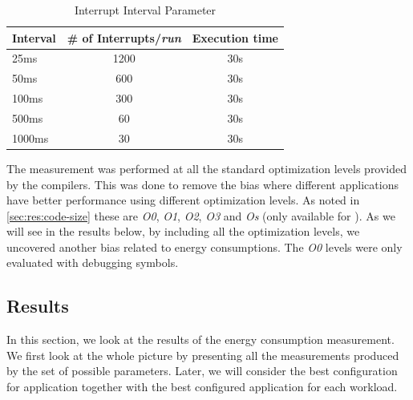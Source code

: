 \begin{table}[H]
  \centering
  \begin{tabular}{l | c | c}
    \textbf{Interval} & \textbf{\# of Interrupts/\emph{run}} & \textbf{Execution time} \\
    \hline
    25ms & 1200 & 30s \\
    50ms & 600 & 30s \\
    100ms & 300 & 30s \\
    500ms & 60 & 30s \\
    1000ms & 30 & 30s \\
    \hline
  \end{tabular}
  \caption{Interrupt Interval Parameter}
  \label{tab:res:energy:parameters}
\end{table}

The measurement was performed at all the standard optimization levels provided by the compilers.
This was done to remove the bias where different applications have better performance using different optimization levels.
As noted in \autoref{sec:res:code-size} these are \emph{O0}, \emph{O1}, \emph{O2}, \emph{O3} and \emph{Os} (only available for {\C}).
As we will see in the results below, by including all the optimization levels, we uncovered another bias related to energy consumptions.
The \emph{O0} levels were only evaluated with debugging symbols.

\subsection{Results}

In this section, we look at the results of the energy consumption measurement.
We first look at the whole picture by presenting all the measurements produced by the set of possible parameters.
Later, we will consider the best configuration for {\C} application together with the best configured {\rust} application for each workload.

